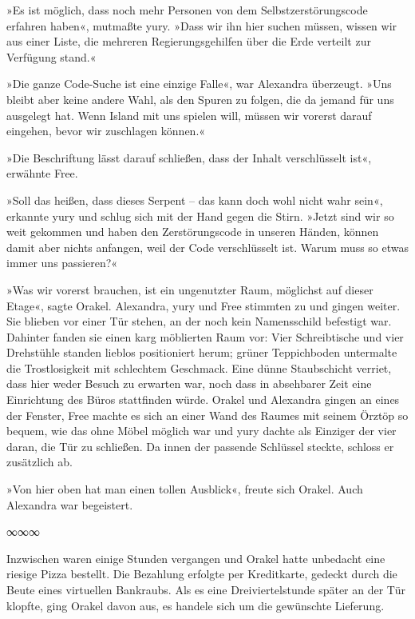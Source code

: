 »Es ist möglich, dass noch mehr Personen von dem Selbstzerstörungscode erfahren haben«, mutmaßte yury. »Dass wir ihn hier suchen müssen, wissen wir aus einer Liste, die mehreren Regierungsgehilfen über die Erde verteilt zur Verfügung stand.«

»Die ganze Code-Suche ist eine einzige Falle«, war Alexandra überzeugt. »Uns bleibt aber keine andere Wahl, als den Spuren zu folgen, die da jemand für uns ausgelegt hat. Wenn Island mit uns spielen will, müssen wir vorerst darauf eingehen, bevor wir zuschlagen können.«

»Die Beschriftung lässt darauf schließen, dass der Inhalt verschlüsselt ist«, erwähnte Free.

»Soll das heißen, dass dieses Serpent – das kann doch wohl nicht wahr sein«, erkannte yury und schlug sich mit der Hand gegen die Stirn. »Jetzt sind wir so weit gekommen und haben den Zerstörungscode in unseren Händen, können damit aber nichts anfangen, weil der Code verschlüsselt ist. Warum muss so etwas immer uns passieren?«

»Was wir vorerst brauchen, ist ein ungenutzter Raum, möglichst auf dieser Etage«, sagte Orakel. Alexandra, yury und Free stimmten zu und gingen weiter. Sie blieben vor einer Tür stehen, an der noch kein Namensschild befestigt war. Dahinter fanden sie einen karg möblierten Raum vor: Vier Schreibtische und vier Drehstühle standen lieblos positioniert herum; grüner Teppichboden untermalte die Trostlosigkeit mit schlechtem Geschmack. Eine dünne Staubschicht verriet, dass hier weder Besuch zu erwarten war, noch dass in absehbarer Zeit eine Einrichtung des Büros stattfinden würde. Orakel und Alexandra gingen an eines der Fenster, Free machte es sich an einer Wand des Raumes mit seinem Örztöp so bequem, wie das ohne Möbel möglich war und yury dachte als Einziger der vier daran, die Tür zu schließen. Da innen der passende Schlüssel steckte, schloss er zusätzlich ab.

»Von hier oben hat man einen tollen Ausblick«, freute sich Orakel. Auch Alexandra war begeistert.

\begin{center}
	∞∞∞
\end{center}

Inzwischen waren einige Stunden vergangen und Orakel hatte unbedacht eine riesige Pizza bestellt. Die Bezahlung erfolgte per Kreditkarte, gedeckt durch die Beute eines virtuellen Bankraubs. Als es eine Dreiviertelstunde später an der Tür klopfte, ging Orakel davon aus, es handele sich um die gewünschte Lieferung.

